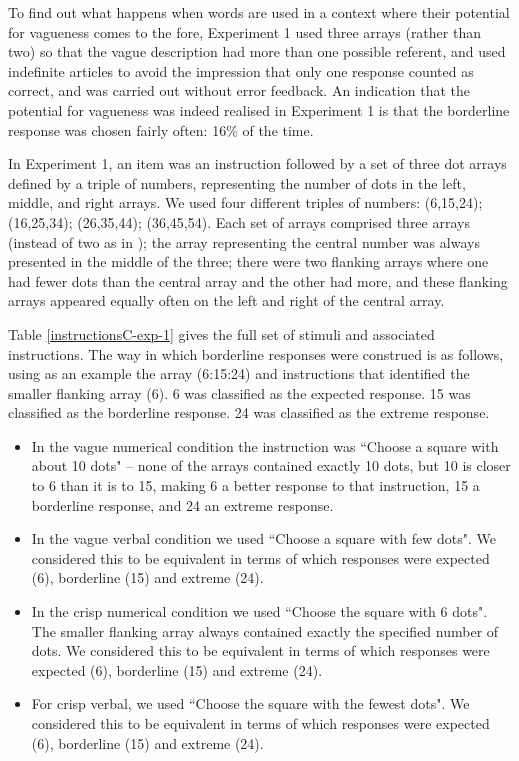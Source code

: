 
To find out what happens when words are used in a context where their potential for vagueness comes to the fore, Experiment 1 used three arrays (rather than two) so that the vague description had more than one possible referent, and used indefinite articles to avoid the impression that only one response counted as correct, and was carried out without error feedback. An indication that the potential for vagueness was indeed realised in Experiment 1 is that the borderline response was chosen fairly often: 16\% of the time.

In Experiment 1, an item was an instruction followed by a set of three dot arrays defined by a triple of numbers, representing the number of dots in the left, middle, and right arrays. We used four different triples of numbers: (6,15,24); (16,25,34); (26,35,44); (36,45,54). Each set of arrays comprised three arrays (instead of two as in \citet{green2013utility}); the array representing the central number was always presented in the middle of the three; there were two flanking arrays where one had fewer dots than the central array and the other had more, and these flanking arrays appeared equally often on the left and right of the central array. 

Table \ref{instructionsC-exp-1} gives the full set of stimuli and associated instructions. The way in which borderline responses were construed is as follows, using as an example the array (6:15:24) and instructions that identified the smaller flanking array (6). 6 was classified as the expected response. 15 was classified as the borderline response. 24 was classified as the extreme response. 

\begin{itemize}
	\item In the vague numerical condition the instruction was ``Choose a square with about 10 dots" -- none of the arrays contained exactly 10 dots, but 10 is closer to 6 than it is to 15, making 6 a better response to that instruction, 15 a borderline response, and 24 an extreme response. 
	\item In the vague verbal condition we used ``Choose a square with few dots". We considered this to be equivalent in terms of which responses were expected (6), borderline (15) and extreme (24).
	\item In the crisp numerical condition we used ``Choose the square with 6 dots". The smaller flanking array always contained exactly the specified number of dots. We considered this to be equivalent in terms of which responses were expected (6), borderline (15) and extreme (24).
	\item For crisp verbal, we used ``Choose the square with the fewest dots". We considered this to be equivalent in terms of which responses were expected (6), borderline (15) and extreme (24).
\end{itemize}

